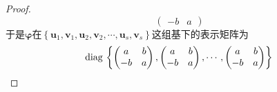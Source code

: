 {\begin{proof}
\[\begin{pmatrix}
                -b & a
            \end{pmatrix}
        \]于是$\bm{\varphi}$在$\left\{
            \bm{u}_1,\bm{v}_1,\bm{u}_2,\bm{v}_2,\cdots,\bm{u}_s,\bm{v}_s
            \right\}$这组基下的表示矩阵为\[
            \mathrm{diag}\,\left\{
            \begin{pmatrix}
                a  & b \\
                -b & a
            \end{pmatrix},\begin{pmatrix}
                a  & b \\
                -b & a
            \end{pmatrix},\cdots,\begin{pmatrix}
                a  & b \\
                -b & a
            \end{pmatrix}
            \right\}\qedhere
        \]
    \end{proof}
}
